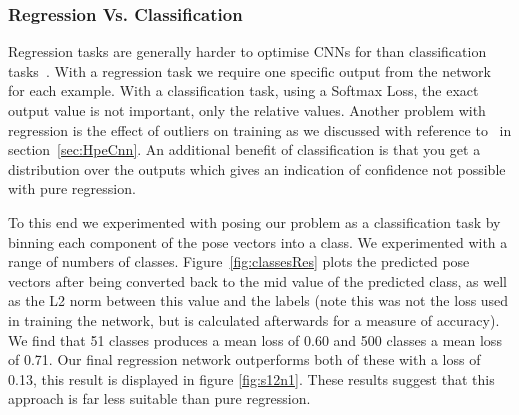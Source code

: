 \documentclass[11pt]{article} %
\begin{document}
\subsubsection{Regression Vs. Classification}

Regression tasks are generally harder to optimise CNNs for than classification tasks~\cite{KarLects}. With a regression task we require one specific output from the network for each example. With a classification task, using a Softmax Loss, the exact output value is not important, only the relative values. Another problem with regression is the effect of outliers on training as we discussed with reference to~\cite{Belagiannis} in section~\ref{sec:HpeCnn}. An additional benefit of classification is that you get a distribution over the outputs which gives an indication of confidence not possible with pure regression. 

To this end we experimented with posing our problem as a classification task by binning each component of the pose vectors into a class. We experimented with a range of numbers of classes. Figure~\ref{fig:classesRes} plots the predicted pose vectors after being converted back to the mid value of the predicted class, as well as the L2 norm between this value and the labels (note this was not the loss used in training the network, but is calculated afterwards for a measure of accuracy). We find that 51 classes produces a mean loss of 0.60 and 500 classes a mean loss of 0.71. Our final regression network outperforms both of these with a loss of 0.13, this result is displayed in figure \ref{fig:s12n1}. These results suggest that this approach is far less suitable than pure regression. 
\end{document}
